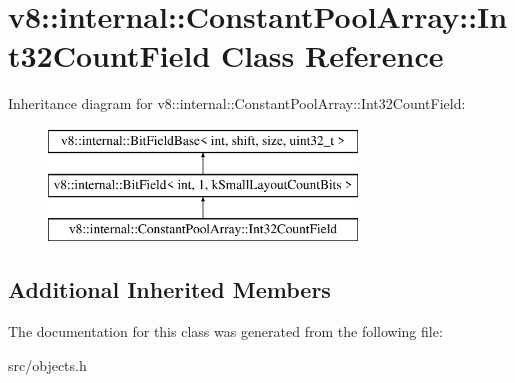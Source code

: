 \hypertarget{classv8_1_1internal_1_1_constant_pool_array_1_1_int32_count_field}{}\section{v8\+:\+:internal\+:\+:Constant\+Pool\+Array\+:\+:Int32\+Count\+Field Class Reference}
\label{classv8_1_1internal_1_1_constant_pool_array_1_1_int32_count_field}
Inheritance diagram for v8\+:\+:internal\+:\+:Constant\+Pool\+Array\+:\+:Int32\+Count\+Field\+:\begin{figure}[H]
\begin{center}
\leavevmode
\includegraphics[height=3.000000cm]{classv8_1_1internal_1_1_constant_pool_array_1_1_int32_count_field}
\end{center}
\end{figure}
\subsection*{Additional Inherited Members}


The documentation for this class was generated from the following file\+:\begin{DoxyCompactItemize}
\item 
src/objects.\+h\end{DoxyCompactItemize}
